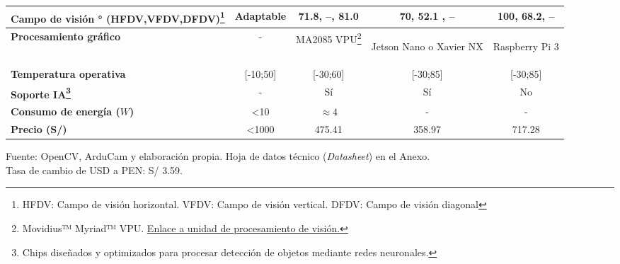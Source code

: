 \begin{itemize}
\begin{savenotes}
\begin{mytable}[H]
\begin{tabular}{l|c|c|c|c|}
{				\begin{minipage}{\myforthmaxsizeofcontenttable}
					\textbf{Campo de visión ° (HFDV,VFDV,DFDV)\footnote{HFDV: Campo de visión horizontal. VFDV: Campo de visión vertical. DFDV: Campo de visión diagonal}}
				\end{minipage}
			} & Adaptable & 71.8, --, 81.0 & 70, 52.1 , -- & 100, 68.2, -- \\ \hline
			\multicolumn{1}{|l|}{
				\begin{minipage}{\myforthmaxsizeofcontenttable}	
					\textbf{Procesamiento gráfico}
				\end{minipage}
			} & - & MA2085 VPU\footnote{Movidius™ Myriad™ VPU. \href{https://www.intel.com/content/www/us/en/products/processors/movidius-vpu/movidius-myriad-x.html}{Enlace a unidad de procesamiento de visión.}} & 
			\begin{minipage}{\mythirdmaxsizeofcontenttable}\begin{myflushcenter}
				Jetson Nano o Xavier NX
			\end{myflushcenter}\end{minipage}
		 	& \begin{minipage}{\mythirdmaxsizeofcontenttable}\begin{myflushcenter}
		 			Raspberry Pi 3
		 	\end{myflushcenter}\end{minipage} \\ \hline 
		 	\multicolumn{1}{|l|}{
		 		\begin{minipage}{\myforthmaxsizeofcontenttable}	
		 			\textbf{Temperatura operativa}
		 		\end{minipage}
		 	} & [-10;50] & [-30;60] & [-30;85] & [-30;85] \\ \hline
			\multicolumn{1}{|l|}{
				\begin{minipage}{\myforthmaxsizeofcontenttable}	
					\textbf{Soporte IA\footnote{Chips diseñados y optimizados para procesar detección de objetos mediante redes neuronales.}}
				\end{minipage}
			} & - & Sí & Sí & No \\ \hline
			\multicolumn{1}{|l|}{
				\begin{minipage}{\myforthmaxsizeofcontenttable}	
					\textbf{Consumo de energía ($W$)}
				\end{minipage}
			} & <10 & $\approx4$ & - & - \\ \hline
			\multicolumn{1}{|l|}{
				\begin{minipage}{\myforthmaxsizeofcontenttable}	
					\textbf{Precio (S/)}
				\end{minipage}
			} & <1000 & 475.41 & 358.97 & 717.28 \\ \hline
		\end{tabular}
		\begin{flushleft}	
			Fuente: OpenCV, ArduCam y elaboración propia. Hoja de datos técnico (\textit{Datasheet}) en el Anexo.\\
			Tasa de cambio de USD a PEN: S/ 3.59.
		\end{flushleft}
	\end{mytable}
	\end{savenotes}
	

\end{itemize}
